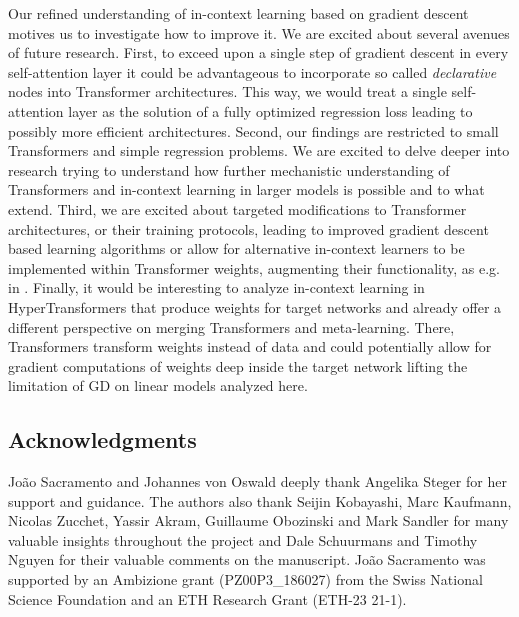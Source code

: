 \documentclass{article}
\theoremstyle{plain}
\theoremstyle{definition}
\theoremstyle{remark}
\begin{document}
Our refined understanding of in-context learning based on gradient descent motives us to investigate how to improve it. We are excited about several avenues of future research. 
First, to exceed upon a single step of gradient descent in every self-attention layer it could be advantageous to incorporate so called  \textit{declarative} nodes \citep{amos_optnet_2017,bai_deep_2019,gould_deep_2021,zucchet_beyond_2022} into Transformer architectures. This way, we would treat a single self-attention layer as the solution of a fully optimized regression loss leading to possibly more efficient architectures.
Second, our findings are restricted to small Transformers and simple regression problems. We are excited to delve deeper into research trying to understand how further mechanistic understanding of Transformers and in-context learning in larger models is possible and to what extend.
Third, we are excited about targeted modifications to Transformer architectures, or their training protocols, leading to improved gradient descent based learning algorithms or allow for alternative in-context learners to be implemented within Transformer weights, augmenting their functionality, as e.g. in \citet{dai2023why}.
Finally, it would be interesting to analyze in-context learning in HyperTransformers \citep{hypertransformer} that produce weights for target networks and already offer a different perspective on merging Transformers and meta-learning. There, Transformers transform weights instead of data and could potentially allow for gradient computations of weights deep inside the target network lifting the limitation of GD on linear models analyzed here.

\subsection*{Acknowledgments}
João Sacramento and Johannes von Oswald deeply thank Angelika Steger for her support and guidance. The authors also thank Seijin Kobayashi, Marc Kaufmann, Nicolas Zucchet, Yassir Akram, Guillaume Obozinski and Mark Sandler for many valuable insights throughout the project and Dale Schuurmans and Timothy Nguyen for their valuable comments on the manuscript. João Sacramento was supported by an Ambizione grant (PZ00P3\_186027) from the Swiss National Science Foundation and an ETH Research Grant (ETH-23 21-1). 

\newpage


\end{document}
